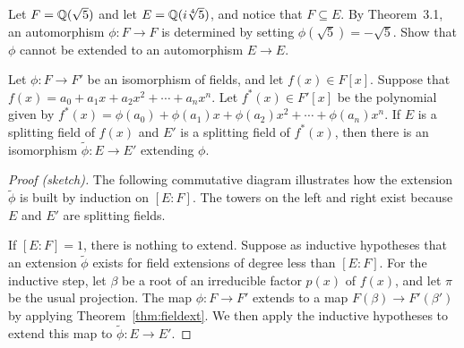 \begin{problem}\label{prob:noext}
    Let $F = \mathbb{Q}(\sqrt{5})$ and let $E = \mathbb{Q}(i\sqrt[4]{5})$, and notice that $F\subseteq E$. By Theorem~3.1, an automorphism $\phi:F\longrightarrow F$ is determined by setting $\phi(\sqrt{5})=-\sqrt{5}$. Show that $\phi$ cannot be extended to an automorphism $E\longrightarrow E$.
\end{problem}

\begin{theorem}\label{thm:isomextthm}
    Let $\phi:F\longrightarrow F'$ be an isomorphism of fields, and let $f(x)\in F[x]$. Suppose that $f(x)=a_0 + a_1x + a_2x^2 + \cdots + a_nx^n$. Let $f^*(x)\in F'[x]$ be the polynomial given by $f^*(x)=\phi(a_0) + \phi(a_1)x + \phi(a_2)x^2 + \cdots + \phi(a_n)x^n$. If $E$ is a splitting field of $f(x)$ and $E'$ is a splitting field of $f^*(x)$, then there is an isomorphism $\tilde{\phi}:E \longrightarrow E'$ extending $\phi$.
\end{theorem}

\begin{proof}[Proof (sketch)] The following commutative diagram illustrates how the extension $\tilde{\phi}$ is built by induction on $[E:F]$. The towers on the left and right exist because $E$ and $E'$ are splitting fields.
\begin{center}\small
{}
\end{center}
If $[E:F] = 1$, there is nothing to extend. Suppose as inductive hypotheses that an extension $\tilde{\phi}$ exists for field extensions of degree less than $[E:F]$. For the inductive step, let $\beta$ be a root of an irreducible factor $p(x)$ of $f(x)$, and let $\pi$ be the usual projection. The map $\phi: F \longrightarrow F'$ extends to a map $F(\beta) \longrightarrow F'(\beta')$ by applying Theorem~\ref{thm:fieldext}. We then apply the inductive hypotheses to extend this map to $\tilde{\phi}:E \longrightarrow E'$.
\end{proof}

